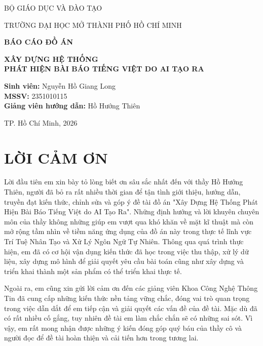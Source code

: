 \documentclass[12pt,a4paper]{report}
\begin{document}
\begin{titlepage}
    \centering
    {\large BỘ GIÁO DỤC VÀ ĐÀO TẠO\par}
    \vspace{0.3cm}
    {\large TRƯỜNG ĐẠI HỌC MỞ THÀNH PHỐ HỒ CHÍ MINH\par}
    \vspace{2cm}
    {\Large \textbf{BÁO CÁO ĐỒ ÁN}\par}
    \vspace{1.5cm}
    {\LARGE \textbf{XÂY DỰNG HỆ THỐNG}\\
    \vspace{0.3cm}
    \textbf{PHÁT HIỆN BÀI BÁO TIẾNG VIỆT DO AI TẠO RA}\par}
    \vfill
    \begin{flushleft}
        \textbf{Sinh viên:} Nguyễn Hồ Giang Long\\
        \textbf{MSSV:} 2351010115\\
        \textbf{Giảng viên hướng dẫn:} Hồ Hướng Thiên
    \end{flushleft}
    \vfill
    TP. Hồ Chí Minh, 2026
\end{titlepage}


\chapter*{LỜI CẢM ƠN}
Lời đầu tiên em xin bày tỏ lòng biết ơn sâu sắc nhất đến với thầy Hồ Hướng Thiên, người đã bỏ ra rất nhiều thời gian để tận tình giới thiệu, hướng dẫn, truyền đạt kiến thức, chỉnh sửa
và góp ý đề tài đồ án "Xây Dựng Hệ Thống Phát Hiện Bài Báo Tiếng Việt do AI Tạo Ra". Những định hướng và lời khuyên chuyên môn của thầy không những giúp em vượt qua khó khăn về mặt kĩ thuật
mà còn mở rộng tầm nhìn về tiềm năng ứng dụng của đồ án này trong thực tế lĩnh vực Trí Tuệ Nhân Tạo và Xử Lý Ngôn Ngữ Tự Nhiên. Thông qua quá trình thực hiện, em đã có cơ hội vận dụng kiến thức
đã học trong việc thu thập, xử lý dữ liệu, xây dựng mô hình để giải quyết yêu cầu bài toán cũng như xây dựng và triển khai thành một sản phẩm có thể triển khai thực tế. 

\vspace{\baselineskip}
\noindent
Ngoài ra, em cũng xin gửi lời cảm ơn đến các giảng viên Khoa Công Nghệ Thông Tin đã cung cấp những kiến thức nền tảng vững chắc, đóng vai trò quan trọng trong việc dẫn dắt để em tiếp cận và giải 
quyết các vấn đề của đề tài. Mặc dù đã có rất nhiều cố gắng, tuy nhiên đề tài em làm chắc chắn sẽ có những sai sót. Vì vậy, em rất mong nhận được những ý kiến đóng góp quý báu của thầy cô và người đọc
để đề tài hoàn thiện và cải tiến hơn trong tương lai.
\end{document}

